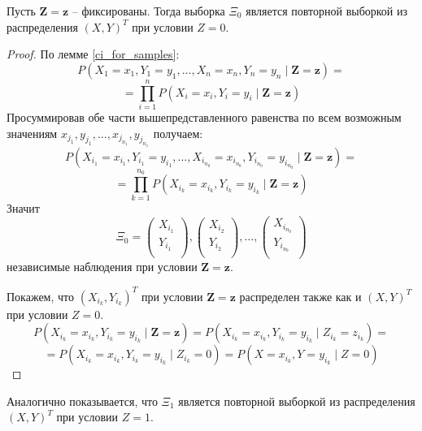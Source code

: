 \begin{theorem}
    Пусть $\mathbf{Z}=\mathbf{z}$ -- фиксированы. Тогда выборка $\Xi_0$ является повторной выборкой из распределения $(X,Y)^T$ при условии $Z=0$.
\end{theorem}
\begin{proof}
    По лемме \ref{ci_for_samples}:
    $$
    P(X_1=x_1,Y_1=y_1,\ldots,X_n=x_n,Y_n=y_n \mid \mathbf{Z}=\mathbf{z})=
    $$
    $$
    =\prod_{i=1}^n P(X_i=x_i, Y_i=y_i \mid \mathbf{Z}=\mathbf{z})
    $$
    Просуммировав обе части вышепредставленного равенства по всем возможным значениям 
    $x_{j_1}, y_{j_1}, \ldots, x_{j_{n_1}},y_{j_{n_1}}$ получаем:
    $$
    P(X_{i_1}=x_{i_1},Y_{i_1}=y_{i_1},\ldots,X_{i_{n_0}}=x_{i_{n_0}},Y_{i_{n_0}}=y_{i_{n_0}} \mid \mathbf{Z}=\mathbf{z})=
    $$
    $$
    =\prod_{k=1}^{n_0} P(X_{i_k}=x_{i_k}, Y_{i_k}=y_{i_k} \mid \mathbf{Z}=\mathbf{z})
    $$
    Значит $$
    \Xi_0=
    \begin{pmatrix}
        X_{i_1} \\
        Y_{i_1} \\
    \end{pmatrix},
    \begin{pmatrix}
        X_{i_2} \\
        Y_{i_2} \\
    \end{pmatrix}, \ldots,
    \begin{pmatrix}
        X_{i_{n_0}} \\
        Y_{i_{n_0}} \\
    \end{pmatrix} 
    $$
    независимые наблюдения при условии $\mathbf{Z}=\mathbf{z}$.

    Покажем, что $(X_{i_k},Y_{i_k})^T$ при условии $\mathbf{Z}=\mathbf{z}$ распределен также как и 
    $(X,Y)^T$ при условии $Z=0$.
    $$
    P(X_{i_k}=x_{i_k}, Y_{i_k}=y_{i_k} \mid \mathbf{Z}=\mathbf{z}) =
    P(X_{i_k}=x_{i_k}, Y_{i_k}=y_{i_k} \mid Z_{i_k}=z_{i_k}) = $$
    $$=P(X_{i_k}=x_{i_k}, Y_{i_k}=y_{i_k} \mid Z_{i_{k}}=0)=
    P(X=x_{i_k}, Y=y_{i_k} \mid Z=0)$$
\end{proof}

Аналогично показывается, что $\Xi_1$ является повторной выборкой из распределения $(X,Y)^T$ при условии $Z=1$.

